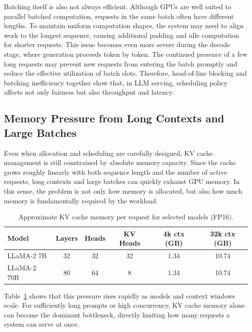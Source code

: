\documentclass[10pt, a4paper]{article}
\begin{document}
Batching itself is also not always efficient. Although GPUs are well suited to
parallel batched computation, requests in the same batch often have different
lengths. To maintain uniform computation shapes, the system may need to align
work to the longest sequence, causing additional padding and idle computation
for shorter requests. This issue becomes even more severe during the decode
stage, where generation proceeds token by token. The continued presence of a
few long requests may prevent new requests from entering the batch promptly and
reduce the effective utilization of batch slots. Therefore, head-of-line
blocking and batching inefficiency together show that, in LLM serving,
scheduling policy affects not only fairness but also throughput and latency.

\subsection{Memory Pressure from Long Contexts and Large Batches}


Even when allocation and scheduling are carefully designed, KV cache
management is still constrained by absolute memory capacity. Since the cache
grows roughly linearly with both sequence length and the number of active
requests, long contexts and large batches can quickly exhaust GPU memory. In
this sense, the problem is not only how memory is allocated, but also how much
memory is fundamentally required by the workload.

\begin{table}[htbp]
    \centering
    \caption{Approximate KV cache memory per request for selected models (FP16).\cite{touvron2023llama2}}
    \label{tab:kvcache_size}
    \begin{tabular}{lccccc}
        \toprule
        \textbf{Model} & \textbf{Layers} & \textbf{Heads} &\textbf{KV Heads} &
        \textbf{4k ctx (GB)} & \textbf{32k ctx (GB)} \\
        \midrule
        LLaMA-2 7B   & 32 & 32 &32 & 1.34  & 10.74  \\
        LLaMA-2 70B  & 80 & 64 & 8 &1.34  & 10.74 \\
        \bottomrule
    \end{tabular}
\end{table}

Table~\ref{tab:kvcache_size} shows that this pressure rises rapidly as models
and context windows scale. For sufficiently long prompts or high concurrency,
KV cache memory alone can become the dominant bottleneck, directly limiting how
many requests a system can serve at once.
\end{document}
